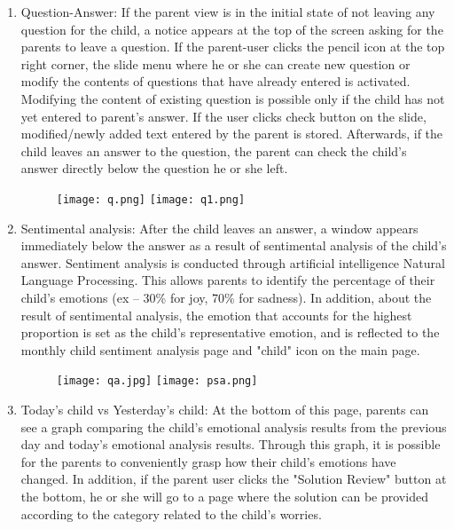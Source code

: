 \documentclass[conference]{IEEEtran}
\begin{document}
\begin{enumerate}
            \begin{enumerate}
                \item Question-Answer: If the parent view is in the initial state of not leaving any question for the child, a notice appears at the top of the screen asking for the parents to leave a question. If the parent-user clicks the pencil icon at the top right corner, the slide menu where he or she can create new question or modify the contents of questions that have already entered is activated. Modifying the content of existing question is possible only if the child has not yet entered to parent's answer. If the user clicks check button on the slide, modified/newly added text entered by the parent is stored. Afterwards, if the child leaves an answer to the question, the parent can check the child's answer directly below the question he or she left.
                 \begin{figure}[H]
                 \centering
                 \texttt{[image: q.png]}
                 \texttt{[image: q1.png]}
                 \end{figure}
                \item Sentimental analysis:
                After the child leaves an answer, a window appears immediately below the answer as a result of sentimental analysis of the child's answer. Sentiment analysis is conducted through artificial intelligence Natural Language Processing. This allows parents to identify the percentage of their child's emotions (ex – 30\% for joy, 70\% for sadness). In addition, about the result of sentimental analysis, the emotion that accounts for the highest proportion is set as the child's representative emotion, and is reflected to the monthly child sentiment analysis page and "child" icon on the main page.
                \begin{figure}[H]
                 \centering
                 \texttt{[image: qa.jpg]}
                 \texttt{[image: psa.png]}
                 \end{figure}
                \item Today's child vs Yesterday's child: At the bottom of this page, parents can see a graph comparing the child's emotional analysis results from the previous day and today's emotional analysis results. Through this graph, it is possible for the parents to conveniently grasp how their child's emotions have changed. In addition, if the parent user clicks the "Solution Review" button at the bottom, he or she will go to a page where the solution can be provided according to the category related to the child's worries.

\end{enumerate}
\end{enumerate}
\end{document}
